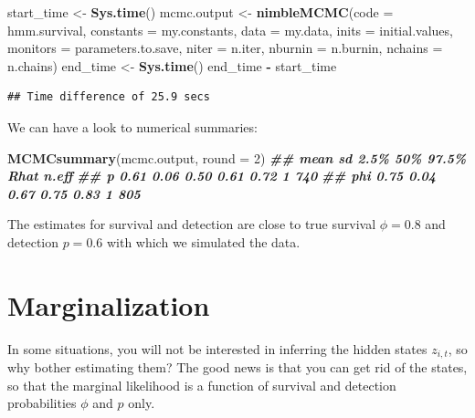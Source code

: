 \documentclass[
  12pt,
]{krantz}
\newenvironment{Shaded}{\begin{snugshade}}{\end{snugshade}}
\newcommand{\AttributeTok}[1]{\textcolor[rgb]{0.13,0.29,0.53}{#1}}
\newcommand{\DecValTok}[1]{\textcolor[rgb]{0.00,0.00,0.81}{#1}}
\newcommand{\DocumentationTok}[1]{\textcolor[rgb]{0.56,0.35,0.01}{\textbf{\textit{#1}}}}
\newcommand{\FunctionTok}[1]{\textcolor[rgb]{0.13,0.29,0.53}{\textbf{#1}}}
\newcommand{\NormalTok}[1]{#1}
\newcommand{\OtherTok}[1]{\textcolor[rgb]{0.56,0.35,0.01}{#1}}
\newcommand{\SpecialCharTok}[1]{\textcolor[rgb]{0.81,0.36,0.00}{\textbf{#1}}}
\begin{document}
\begin{Shaded}
\begin{Highlighting}[]
\NormalTok{start\_time }\OtherTok{\textless{}{-}} \FunctionTok{Sys.time}\NormalTok{()}
\NormalTok{mcmc.output }\OtherTok{\textless{}{-}} \FunctionTok{nimbleMCMC}\NormalTok{(}\AttributeTok{code =}\NormalTok{ hmm.survival,}
                          \AttributeTok{constants =}\NormalTok{ my.constants,}
                          \AttributeTok{data =}\NormalTok{ my.data,}
                          \AttributeTok{inits =}\NormalTok{ initial.values,}
                          \AttributeTok{monitors =}\NormalTok{ parameters.to.save,}
                          \AttributeTok{niter =}\NormalTok{ n.iter,}
                          \AttributeTok{nburnin =}\NormalTok{ n.burnin,}
                          \AttributeTok{nchains =}\NormalTok{ n.chains)}
\NormalTok{end\_time }\OtherTok{\textless{}{-}} \FunctionTok{Sys.time}\NormalTok{()}
\NormalTok{end\_time }\SpecialCharTok{{-}}\NormalTok{ start\_time}
\end{Highlighting}
\end{Shaded}

\begin{verbatim}
## Time difference of 25.9 secs
\end{verbatim}

We can have a look to numerical summaries:

\begin{Shaded}
\begin{Highlighting}[]
\FunctionTok{MCMCsummary}\NormalTok{(mcmc.output, }\AttributeTok{round =} \DecValTok{2}\NormalTok{)}
\DocumentationTok{\#\#     mean   sd 2.5\%  50\% 97.5\% Rhat n.eff}
\DocumentationTok{\#\# p   0.61 0.06 0.50 0.61  0.72    1   740}
\DocumentationTok{\#\# phi 0.75 0.04 0.67 0.75  0.83    1   805}
\end{Highlighting}
\end{Shaded}

The estimates for survival and detection are close to true survival \(\phi = 0.8\) and detection \(p = 0.6\) with which we simulated the data.

\section{Marginalization}\label{marginalization}

In some situations, you will not be interested in inferring the hidden states \(z_{i,t}\), so why bother estimating them? The good news is that you can get rid of the states, so that the marginal likelihood is a function of survival and detection probabilities \(\phi\) and \(p\) only.
\end{document}
